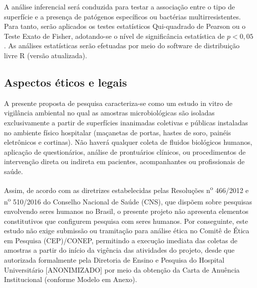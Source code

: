 \documentclass[12pt,a4paper]{article}
\begin{document}
A análise inferencial será conduzida para testar a associação entre o tipo de superfície e a presença de patógenos específicos ou bactérias multirresistentes. Para tanto, serão aplicados os testes estatísticos Qui-quadrado de Pearson ou o Teste Exato de Fisher, adotando-se o nível de significância estatística de $p < 0,05$. As análises estatísticas serão efetuadas por meio do software de distribuição livre R (versão atualizada).

\subsection{Aspectos éticos e legais}
A presente proposta de pesquisa caracteriza-se como um estudo in vitro de vigilância ambiental no qual as amostras microbiológicas são isoladas exclusivamente a partir de superfícies inanimadas coletivas e públicas instaladas no ambiente físico hospitalar (maçanetas de portas, hastes de soro, painéis eletrônicos e cortinas). Não haverá qualquer coleta de fluidos biológicos humanos, aplicação de questionários, análise de prontuários clínicos, ou procedimentos de intervenção direta ou indireta em pacientes, acompanhantes ou profissionais de saúde.

Assim, de acordo com as diretrizes estabelecidas pelas Resoluções n\textsuperscript{o} 466/2012 e n\textsuperscript{o} 510/2016 do Conselho Nacional de Saúde (CNS), que dispõem sobre pesquisas envolvendo seres humanos no Brasil, o presente projeto não apresenta elementos constitutivos que configurem pesquisa com seres humanos. Por conseguinte, este estudo não exige submissão ou tramitação para análise ética no Comitê de Ética em Pesquisa (CEP)/CONEP, permitindo a execução imediata das coletas de amostras a partir do início da vigência das atividades do projeto, desde que autorizada formalmente pela Diretoria de Ensino e Pesquisa do Hospital Universitário [ANONIMIZADO] por meio da obtenção da Carta de Anuência Institucional (conforme Modelo em Anexo).
\newpage

\end{document}
